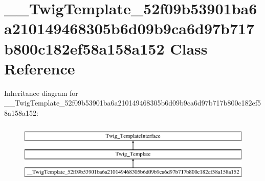 \hypertarget{class_____twig_template__52f09b53901ba6a210149468305b6d09b9ca6d97b717b800c182ef58a158a152}{}\section{\+\_\+\+\_\+\+Twig\+Template\+\_\+52f09b53901ba6a210149468305b6d09b9ca6d97b717b800c182ef58a158a152 Class Reference}
\label{class_____twig_template__52f09b53901ba6a210149468305b6d09b9ca6d97b717b800c182ef58a158a152}
Inheritance diagram for \+\_\+\+\_\+\+Twig\+Template\+\_\+52f09b53901ba6a210149468305b6d09b9ca6d97b717b800c182ef58a158a152\+:\begin{figure}[H]
\begin{center}
\leavevmode
\includegraphics[height=3.000000cm]{class_____twig_template__52f09b53901ba6a210149468305b6d09b9ca6d97b717b800c182ef58a158a152}
\end{center}
\end{figure}
